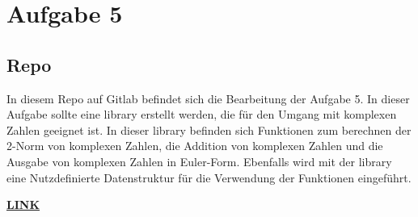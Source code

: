 \chapter{Aufgabe 5}
\section{Repo}
In diesem Repo auf Gitlab befindet sich die Bearbeitung der Aufgabe 5.
In dieser Aufgabe sollte eine library erstellt werden, die für den Umgang mit komplexen Zahlen geeignet ist.
In dieser library befinden sich Funktionen zum berechnen der 2-Norm von komplexen Zahlen, die Addition von komplexen Zahlen und die Ausgabe von komplexen Zahlen in Euler-Form.
Ebenfalls wird mit der library eine Nutzdefinierte Datenstruktur für die Verwendung der Funktionen eingeführt.\par
\href{https://gitlab.thga.de/daniel.krueger/pruefung_sose_2023_aufgabe_5_librarys}{\textbf{LINK}}
